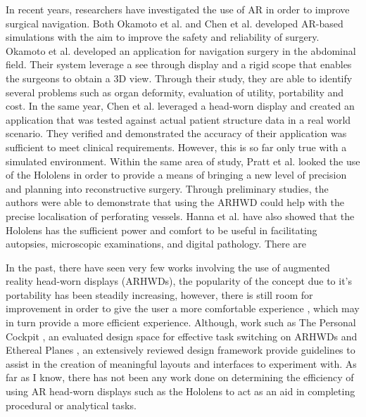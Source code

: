 In recent years, researchers have investigated the use of AR in order to improve surgical navigation. Both Okamoto et al. \cite{Okamoto2015} and Chen et al. \cite{Chen2015} developed AR-based simulations with the aim to improve the safety and reliability of surgery. Okamoto et al. developed an application for navigation surgery in the abdominal field. Their system leverage a see through display and a rigid scope that enables the surgeons to obtain a 3D view. Through their study, they are able to identify several problems such as organ deformity, evaluation of utility, portability and cost. In the same year, Chen et al. leveraged a head-worn display and created an application that was tested against actual patient structure data in a real world scenario. They verified and demonstrated the accuracy of their application was sufficient to meet clinical requirements. However, this is so far only true with a simulated environment. Within the same area of study, Pratt et al. \cite{Pratt2018} looked the use of the Hololens in order to provide a means of bringing a new level of precision and planning into reconstructive surgery. Through preliminary studies, the authors were able to demonstrate that using the ARHWD could help with the precise localisation of perforating vessels. Hanna et al. \cite{Hanna2018} have also showed that the Hololens has the sufficient power and comfort to be useful in facilitating autopsies, microscopic examinations, and digital pathology. There are 

In the past, there have seen very few works involving the use of augmented reality head-worn displays (ARHWDs), the popularity of the concept due to it's portability has been steadily increasing, however, there is still room for improvement in order to give the user a more comfortable experience \cite{Velamkayala2017}, which may in turn provide a more efficient experience. Although, work such as The Personal Cockpit \cite{Ens2014}, an evaluated design space for effective task switching on ARHWDs and Ethereal Planes \cite{Ens2014a}, an extensively reviewed design framework provide guidelines to assist in the creation of meaningful layouts and interfaces to experiment with. As far as I know, there has not been any work done on determining the efficiency of using AR head-worn displays such as the Hololens to act as an aid in completing procedural or analytical tasks. 

